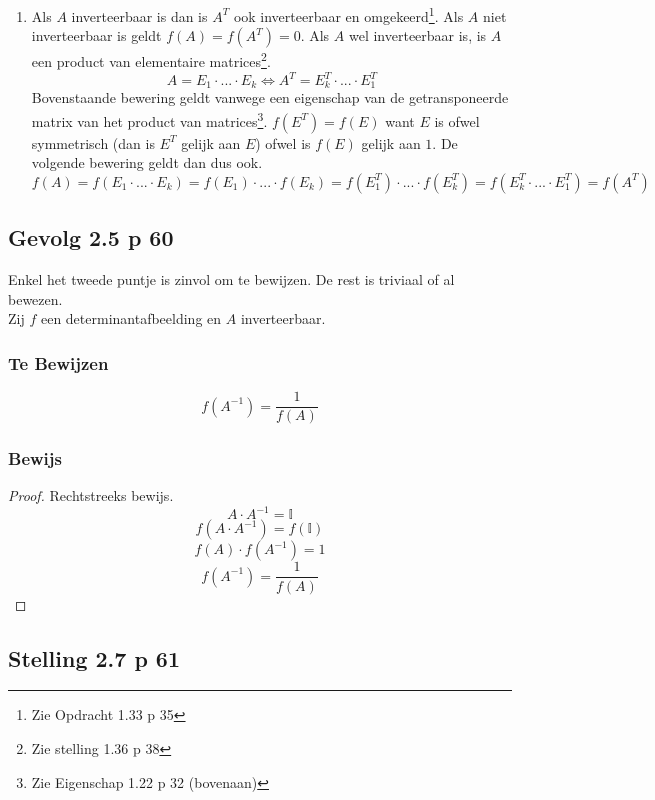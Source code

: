 \documentclass[lineaire_algebra_oplossingen.tex]{subfiles}
\begin{document}
\begin{enumerate}
\[
f(A\cdot B) = f(E_1\cdot ...\cdot E_k \cdot B) = f(E_1\cdot ...\cdot E_k) \cdot f(B)) = f(A)\cdot f(B)
\]
De tweede gelijkheid volgt uit het feit dat $\forall A\in \mathbb{R}^{n\times n}: f(E\cdot A) = f(E)\cdot f(A)$ geldt\footnote{Zie stelling 2.3 p 58}.
\item 
Als $A$ inverteerbaar is dan is $A^T$ ook inverteerbaar en omgekeerd\footnote{Zie Opdracht 1.33 p 35}. Als $A$ niet inverteerbaar is geldt $f(A) = f(A^T)=0$. Als $A$ wel inverteerbaar is, is $A$ een product van elementaire matrices\footnote{Zie stelling 1.36 p 38}.
\[
A = E_1\cdot ...\cdot E_k \Leftrightarrow A^T =  E_k^T\cdot ...\cdot E_1^T
\]
Bovenstaande bewering geldt vanwege een eigenschap van de getransponeerde matrix van het product van matrices\footnote{Zie Eigenschap 1.22 p 32 (bovenaan)}. $f(E^T)=f(E)$ want $E$ is ofwel symmetrisch (dan is $E^T$ gelijk aan $E$) ofwel is $f(E)$ gelijk aan  $1$. De volgende bewering geldt dan dus ook.
\[
f(A) = f(E_1\cdot ...\cdot E_k) = f(E_1)\cdot ...\cdot f(E_k) = f(E_1^T)\cdot ...\cdot f(E_k^T) = f(E_k^T\cdot ...\cdot E_1^T) = f(A^T)
\]
\end{enumerate}


\subsection{Gevolg 2.5 p 60}
\label{2.5}
Enkel het tweede puntje is zinvol om te bewijzen. De rest is triviaal of al bewezen.\\
Zij $f$ een determinantafbeelding en $A$ inverteerbaar.

\subsubsection*{Te Bewijzen}
\[
f(A^{-1}) = \frac{1}{f(A)}
\]

\subsubsection*{Bewijs}
\begin{proof}
Rechtstreeks bewijs.\\
\[
A \cdot A^{-1} = \mathbb{I}
\]
\[
f(A \cdot A^{-1}) = f(\mathbb{I})
\]
\[
f(A) \cdot f(A^{-1}) = 1
\]
\[
f(A^{-1}) = \frac{1}{f(A)}
\]
\end{proof}


\subsection{Stelling 2.7 p 61}
\label{2.7}
\end{document}
